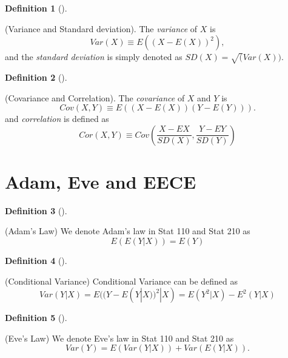 \documentclass[
  letterpaper,
  DIV=11,
  numbers=noendperiod]{scrreprt}
\theoremstyle{plain}
\theoremstyle{definition}
\newtheorem{definition}{Definition}[chapter]
\theoremstyle{remark}
\begin{document}

\leavevmode{}%
\begin{definition}[]\label{def-variance-std}

(Variance and Standard deviation). The \emph{variance} of \(X\) is
\[Var(X)\equiv E((X-E(X))^2),\] and the \emph{standard deviation} is
simply denoted as \(SD(X)=\sqrt(Var(X))\).

\end{definition}

\leavevmode{}%
\begin{definition}[]\label{def-cov-corr}

(Covariance and Correlation). The \emph{covariance} of \(X\) and \(Y\)
is \[Cov(X,Y)\equiv E((X-E(X))(Y-E(Y))).\] and \emph{correlation} is
defined as
\[Cor(X,Y)\equiv Cov \left( \frac{X-EX}{SD(X)},\frac{Y-EY}{SD(Y)} \right)\]

\end{definition}

\hypertarget{adam-eve-and-eece}{%
\section*{Adam, Eve and EECE}\label{adam-eve-and-eece}}


\leavevmode{}%
\begin{definition}[]\label{def-adam}

(Adam's Law) We denote Adam's law in Stat 110 and Stat 210 as
\[E(E(Y|X))=E(Y)\]

\end{definition}

\leavevmode{}%
\begin{definition}[]\label{def-conditional-variance}

(Conditional Variance) Conditional Variance can be defined as
\[Var(Y|X)=E((Y-E(Y|X))^2|X)=E(Y^2|X)-E^2(Y|X)\]

\end{definition}

\leavevmode{}%
\begin{definition}[]\label{def-eve}

(Eve's Law) We denote Eve's law in Stat 110 and Stat 210 as
\[Var(Y)=E(Var(Y|X))+Var(E(Y|X)).\]

\end{definition}
\end{document}
